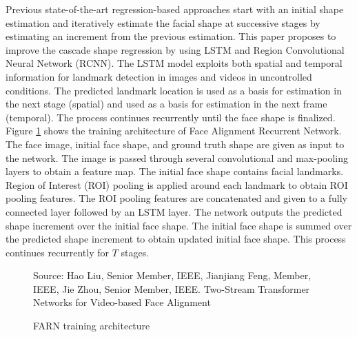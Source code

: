\documentclass{llncs}
\begin{document}
Previous state-of-the-art regression-based approaches start with an initial shape estimation and iteratively estimate the facial shape at successive stages by estimating an increment from the previous estimation. This paper proposes to improve the cascade shape regression by using LSTM and Region Convolutional Neural Network (RCNN). The LSTM model exploits both spatial and temporal information for landmark detection in images and videos in uncontrolled conditions. The predicted landmark location is used as a basis for estimation in the next stage (spatial) and used as a basis for estimation in the next frame (temporal). The process continues recurrently until the face shape is finalized. 
Figure \ref{farn_training} shows the training architecture of Face Alignment Recurrent Network. The face image, initial face shape, and ground truth shape are given as input to the network. The image is passed through several convolutional and max-pooling layers to obtain a feature map. The initial face shape contains facial landmarks. Region of Interest (ROI) pooling is applied around each landmark to obtain ROI pooling features. The ROI pooling features are concatenated and given to a fully connected layer followed by an LSTM layer. The network outputs the predicted shape increment over the initial face shape. The initial face shape is summed over the predicted shape increment to obtain updated initial face shape. This process continues recurrently for $T$ stages.

\begin{figure}
%
{Source: Hao Liu, Senior Member, IEEE, Jianjiang Feng, Member, IEEE, Jie Zhou, Senior Member, IEEE. Two-Stream Transformer Networks for Video-based Face Alignment}
\caption{FARN training architecture}
\label{farn_training}
\end{figure}
\end{document}
